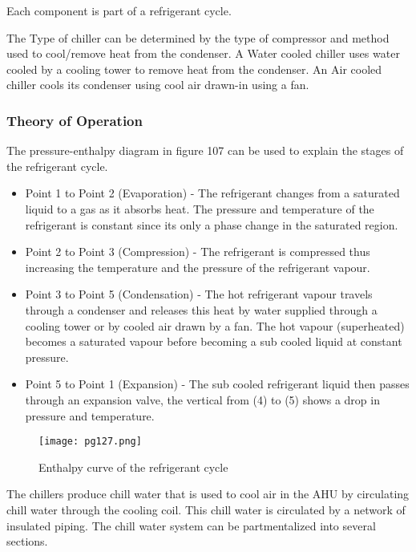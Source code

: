 \documentclass[a4paper,12pt]{article}
\begin{document}
			Each component is part of a refrigerant cycle.
			
			
			The Type of chiller can be determined by the type of compressor and method used to cool/remove heat from the condenser.
			A Water cooled chiller uses water cooled by a cooling tower to remove heat from the condenser. An Air cooled chiller cools its condenser using cool air drawn-in using a fan.
			
			\subsubsection*{Theory of Operation}
								
				The pressure-enthalpy diagram in figure 107 can be used to explain the stages of the refrigerant cycle. 
			
			\begin{itemize}
				\item Point 1 to Point 2 (Evaporation) - The refrigerant changes from a saturated liquid to a gas as it absorbs heat. The pressure and temperature of the refrigerant is constant since its only a phase change in the saturated region.
				\item Point 2 to Point 3 (Compression) - The refrigerant is compressed thus increasing the temperature and the pressure of the refrigerant vapour.
				\item Point 3 to Point 5 (Condensation) - The hot refrigerant vapour travels through a condenser and releases this heat by water supplied through a cooling tower or by cooled air drawn by a fan. The hot vapour (superheated) becomes a saturated vapour before becoming a sub cooled liquid at constant pressure. 
				
				\item Point 5 to Point 1 (Expansion) - The sub cooled refrigerant liquid then passes through an expansion valve, the vertical from (4) to (5) shows a drop in pressure and temperature. 		
			\end{itemize}
			
				\begin{figure}[H]
					\centering
					\texttt{[image: pg127.png]}
					\label{fig:pressure-enthalpy-curve}				
					\caption{Enthalpy curve of the refrigerant cycle \citep{trane}}
				\end{figure}
				
			The chillers produce chill water that is used to cool air in the AHU by circulating chill water through the cooling coil.
			This chill water is circulated by a network of insulated piping.
			The chill water system can be partmentalized into several sections.
			
\end{document}
